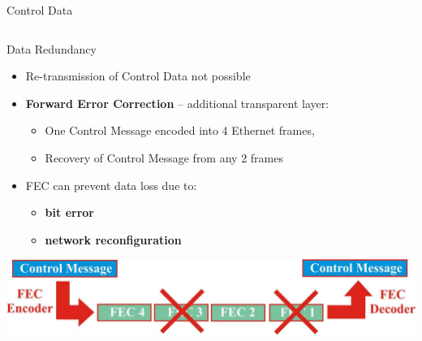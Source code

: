 \documentclass[compress,red]{beamer}
\begin{document}
\begin{frame}{Control Data}
\begin{columns}[c]
\begin{center}
    \end{center}

\end{columns}

\end{frame}
\begin{frame}{Data Redundancy}

  \begin{itemize}
    \item Re-transmission of Control Data not possible
	\item {\bf Forward Error Correction}  -- additional transparent layer:
	\begin{itemize}
		\item One Control Message encoded into 4 Ethernet frames,
		\item Recovery of Control Message from any 2 frames
	\end{itemize}
	\item FEC can prevent data loss due to:
	\begin{itemize}	
		\item {\bf bit error} 
		\item {\bf network reconfiguration}
	\end{itemize}	
  \end{itemize}
  
  	\begin{center}
      \includegraphics[width=.7\textwidth]{../../figures/robustness/FEC.pdf}
    \end{center}
  
\end{frame}
\end{document}
